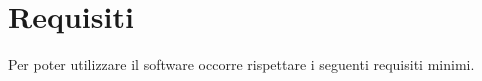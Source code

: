 \section{Requisiti}
Per poter utilizzare il software occorre rispettare i seguenti
requisiti minimi.



